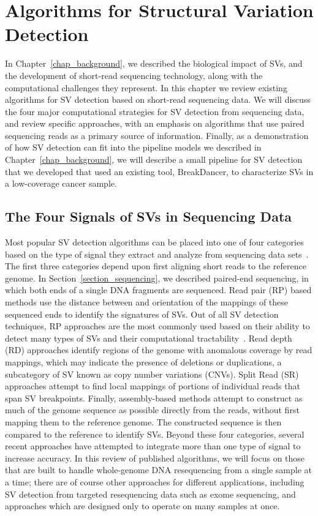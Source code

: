 \chapter{Algorithms for Structural Variation Detection}\label{chap_related_work}

In Chapter~\ref{chap_background}, we described the biological impact of SVs, and the development of short-read sequencing technology, along with the computational challenges they represent. In this chapter we review existing algorithms for SV detection based on short-read sequencing data. We will discuss the four major computational strategies for SV detection from sequencing data, and review specific approaches, with an emphasis on algorithms that use paired sequencing reads as a primary source of information. Finally, as a demonstration of how SV detection can fit into the pipeline models we described in Chapter~\ref{chap_background}, we will describe a small pipeline for SV detection that we developed that used an existing tool, BreakDancer, to characterize SVs in a low-coverage cancer sample. 

\section{The Four Signals of SVs in Sequencing Data}

Most popular SV detection algorithms can be placed into one of four categories based on the type of signal they extract and analyze from sequencing data sets~\cite{Alkan:2011p547,Koboldt:2012gj}. The first three categories depend upon first aligning short reads to the reference genome. In Section~\ref{section_sequencing}, we described paired-end sequencing, in which both ends of a single DNA fragments are sequenced. Read pair (RP) based methods use the distance between and orientation of the mappings of these sequenced ends to identify the signatures of SVs. Out of all SV detection techniques, RP approaches are the most commonly used based on their ability to detect many types of SVs and their computational tractability~\cite{Alkan:2011p547}. Read depth (RD) approaches identify regions of the genome with anomalous coverage by read mappings, which may indicate the presence of deletions or duplications, a subcategory of SV known as copy number variations (CNVs). Split Read (SR) approaches attempt to find local mappings of portions of individual reads that span SV breakpoints. Finally, assembly-based methods attempt to construct as much of the genome sequence as possible directly from the reads, without first mapping them to the reference genome. The constructed sequence is then compared to the reference to identify SVs. Beyond these four categories, several recent approaches have attempted to integrate more than one type of signal to increase accuracy. In this review of published algorithms, we will focus on those that are built to handle whole-genome DNA resequencing from a single sample at a time; there are of course other approaches for different applications, including SV detection from targeted resequencing data such as exome sequencing, and approaches which are designed only to operate on many samples at once.

